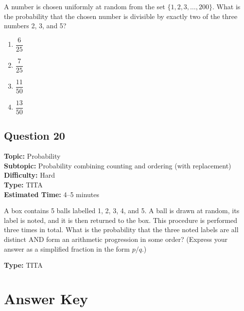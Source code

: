 \documentclass[11pt]{article}
\begin{document}
\begin{tcolorbox}
A number is chosen uniformly at random from the set \( \{1, 2, 3, \ldots, 200\} \). What is the probability that the chosen number is divisible by exactly two of the three numbers 2, 3, and 5?
\end{tcolorbox}

\begin{enumerate}[label=(\Alph*)]
\item \( \dfrac{6}{25} \)
\item \( \dfrac{7}{25} \)
\item \( \dfrac{11}{50} \)
\item \( \dfrac{13}{50} \)
\end{enumerate}

\subsection*{Question 20}
\textbf{Topic:} Probability \\
\textbf{Subtopic:} Probability combining counting and ordering (with replacement) \\
\textbf{Difficulty:} Hard \\
\textbf{Type:} TITA \\
\textbf{Estimated Time:} 4--5 minutes

\begin{tcolorbox}
A box contains 5 balls labelled 1, 2, 3, 4, and 5. A ball is drawn at random, its label is noted, and it is then returned to the box. This procedure is performed three times in total. What is the probability that the three noted labels are all distinct AND form an arithmetic progression in some order? (Express your answer as a simplified fraction in the form \( p/q \).)
\end{tcolorbox}

\textbf{Type:} TITA

\newpage

\section*{Answer Key}
\end{document}

